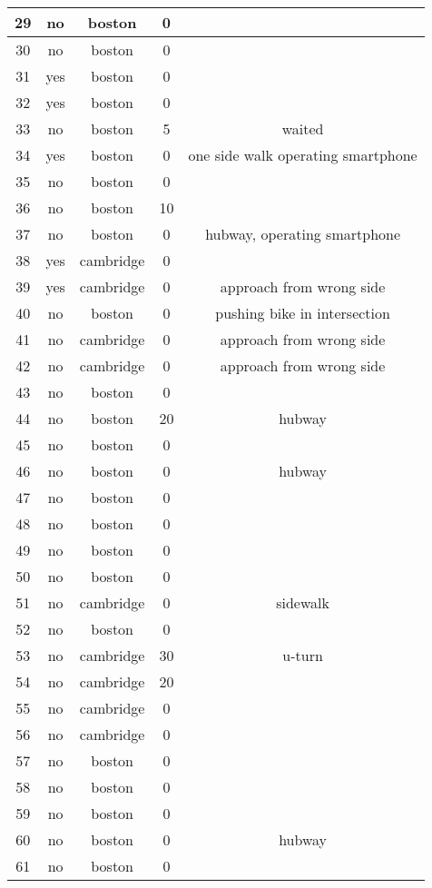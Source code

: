 \begin{longtable}{|c|c|c|c|c|}
29 & no & boston & 0 & \\ \hline
30 & no & boston & 0 & \\ \hline
31 & yes & boston & 0 & \\ \hline
32 & yes & boston & 0 & \\ \hline
33 & no & boston & 5 & waited  \\ \hline
34 & yes & boston & 0 & one side walk operating smartphone \\ \hline
35 & no & boston & 0 & \\ \hline
36 & no & boston & 10 & \\ \hline
37 & no & boston & 0 & hubway, operating smartphone \\ \hline
38 & yes & cambridge & 0 & \\ \hline
39 & yes & cambridge & 0 & approach from wrong side \\ \hline
40 & no & boston & 0 & pushing bike in intersection \\ \hline
41 & no & cambridge & 0 & approach from wrong side \\ \hline
42 & no & cambridge & 0 & approach from wrong side \\ \hline
43 & no & boston & 0 & \\ \hline
44 & no & boston & 20 & hubway \\ \hline
45 & no & boston & 0 & \\ \hline
46 & no & boston & 0 & hubway \\ \hline
47 & no & boston & 0 & \\ \hline
48 & no & boston & 0 & \\ \hline
49 & no & boston & 0 & \\ \hline
50 & no & boston & 0 & \\ \hline
51 & no & cambridge & 0 & sidewalk \\ \hline
52 & no & boston & 0 & \\ \hline
53 & no & cambridge & 30 & u-turn \\ \hline
54 & no & cambridge & 20 & \\ \hline
55 & no & cambridge & 0 & \\ \hline
56 & no & cambridge & 0 & \\ \hline
57 & no & boston & 0 & \\ \hline
58 & no & boston & 0 & \\ \hline
59 & no & boston & 0 & \\ \hline
60 & no & boston & 0 & hubway \\ \hline
61 & no & boston & 0 & \\ \hline

\end{longtable}
